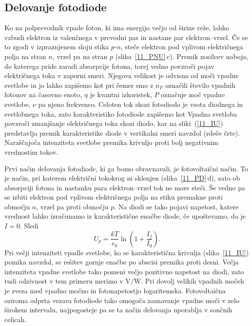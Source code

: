  
\subsection*{Delovanje fotodiode}
Ko na polprevodnik vpade foton, ki ima energijo večjo od širine reže, 
lahko vzbudi elektron iz valenčnega v prevodni pas in nastane par elektron--vrzel. 
Če se to zgodi v izpraznjenem sloju stika $p$-$n$, steče elektron pod vplivom 
električnega polja na stran $n$, vrzel pa na stran $p$ (slika~\ref{11_PNU}\,c). 
Premik nosilcev naboja, do katerega pride zaradi absorpcije fotona, torej vedno
povzroči pojav električnega toka v zaporni smeri. 
Njegova velikost je odvisna od moči vpadne svetlobe in jo lahko zapišemo kot  
pri čemer smo z $n_F$ označili število vpadnih fotonov na časovno enoto, 
$\eta$ je kvantni izkoristek, $P$ označuje moč vpadne svetlobe, $\nu$ pa njeno
frekvenco. Celoten tok skozi fotodiodo je vsota diodnega 
in svetlobnega toka, zato karakteristiko fotodiode zapišemo kot 
Vpadna svetloba povzroči zmanjšanje električnega toka skozi diodo, 
kar na sliki~(\ref{11_IU}) predstavlja premik karakteristike diode v vertikalni 
smeri navzdol (rdeče črte). Naraščajoča intenziteta svetlobe premika krivuljo proti 
bolj negativnim vrednostim tokov. 

Prvi način delovanja fotodiode, ki ga bomo obravnavali, je fotovoltaični način.
To je način, pri katerem električni tokokrog ni sklenjen (slika~\ref{11_PD}\,d), 
zato ob absorpciji fotona in nastanku para elektron--vrzel tok ne more steči. 
Še vedno pa se izbiti elektron pod vplivom električnega polja
na stiku premakne proti območju $n$, vrzel pa proti območju $p$.
Na diodi se tako pojavi napetost, 
katere vrednost lahko izračunamo iz karakteristične enačbe diode, če upoštevamo, da je $I=0$. Sledi
\begin{equation}
U_p = \frac{kT}{e_0}\ln \left(1+ \frac{I_f}{I_0}\right).
\end{equation}
Pri večji intenziteti vpadle svetlobe, ko se karakteristična krivulja (slika~\ref{11_IU}) 
pomika navzdol, se rešitev gornje enačbe po abscisi premika proti desni.
Večja intenziteta vpadne svetlobe tako pomeni večjo 
pozitivno napetost na diodi, zato tudi odzivnost v tem primeru merimo v $\si{\volt}/\si{\watt}$.
Pri dovolj velikih vpadnih močeh je zveza med vpadno močno in fotonapetostjo
logaritemska. Fotovoltaična oziroma odprta vezava fotodiode tako omogoča 
zaznavanje vpadne moči v zelo širokem intervalu, najpogosteje pa se ta 
način delovanja uporablja v sončnih celicah. 

